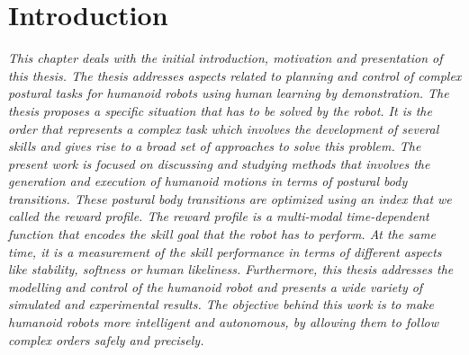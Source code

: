 \chapter{Introduction} \label{ch_intro}
\textit{This chapter deals with the initial introduction, motivation and presentation  of this thesis. The thesis addresses aspects related to planning and control of complex postural tasks for humanoid robots using human learning by demonstration. The thesis proposes a specific situation that has to be solved by the robot. It is the order \robotorder that represents a complex task which involves the development of several skills and gives rise to a broad set of approaches to solve this problem. The present work is focused on discussing and studying methods that involves the generation and execution of humanoid motions in terms of postural body transitions. These postural body transitions are optimized using an index that we called the reward profile. The reward profile  is a multi-modal time-dependent function that encodes the skill goal that the robot has to perform. At the same time, it is a measurement of the skill performance in terms of different aspects like stability, softness or human likeliness. Furthermore, this thesis addresses the modelling and control of the humanoid robot and presents a wide variety of simulated and experimental results. The objective behind this work is to make humanoid robots more intelligent and autonomous, by allowing them to follow complex orders safely and precisely.}
\newpage
%
%
%








